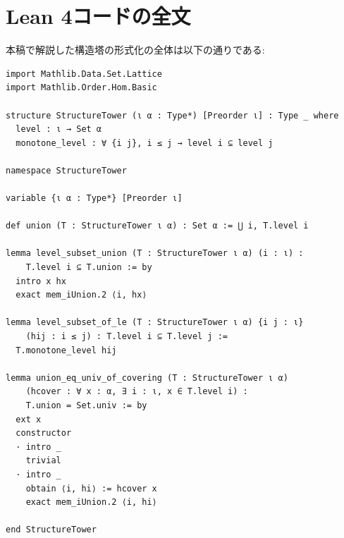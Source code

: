 \documentclass[a4paper,12pt]{article}
\theoremstyle{definition}
\begin{document}
\appendix

\section{Lean 4コードの全文}

本稿で解説した構造塔の形式化の全体は以下の通りである:

\begin{verbatim}
import Mathlib.Data.Set.Lattice
import Mathlib.Order.Hom.Basic

structure StructureTower (ι α : Type*) [Preorder ι] : Type _ where
  level : ι → Set α
  monotone_level : ∀ {i j}, i ≤ j → level i ⊆ level j

namespace StructureTower

variable {ι α : Type*} [Preorder ι]

def union (T : StructureTower ι α) : Set α := ⋃ i, T.level i

lemma level_subset_union (T : StructureTower ι α) (i : ι) :
    T.level i ⊆ T.union := by
  intro x hx
  exact mem_iUnion.2 ⟨i, hx⟩

lemma level_subset_of_le (T : StructureTower ι α) {i j : ι} 
    (hij : i ≤ j) : T.level i ⊆ T.level j := 
  T.monotone_level hij

lemma union_eq_univ_of_covering (T : StructureTower ι α)
    (hcover : ∀ x : α, ∃ i : ι, x ∈ T.level i) :
    T.union = Set.univ := by
  ext x
  constructor
  · intro _
    trivial
  · intro _
    obtain ⟨i, hi⟩ := hcover x
    exact mem_iUnion.2 ⟨i, hi⟩

end StructureTower
\end{verbatim}
\end{document}
